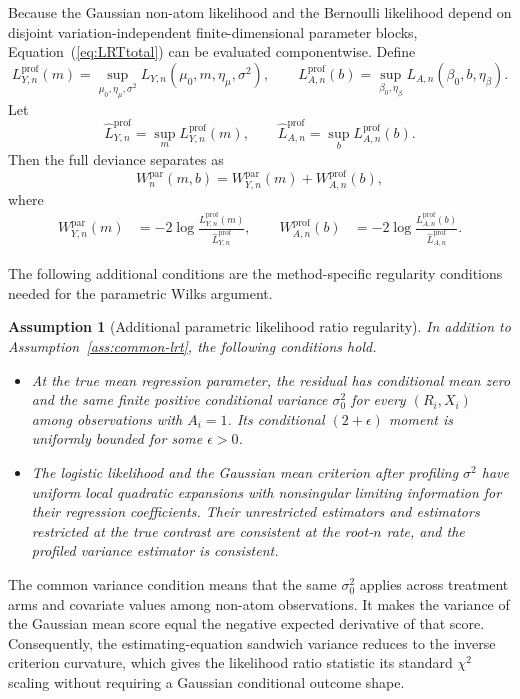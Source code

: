\documentclass[11pt]{article}
\newtheorem{assumption}{Assumption}
\begin{document}
Because the Gaussian non-atom likelihood and the Bernoulli likelihood depend on disjoint variation-independent finite-dimensional parameter blocks, Equation~(\ref{eq:LRTtotal}) can be evaluated componentwise. Define
\[
  L_{Y,n}^{\mathrm{prof}}(m)
  =
  \sup_{\mu_0,\eta_\mu,\sigma^2}
  L_{Y,n}(\mu_0,m,\eta_\mu,\sigma^2),
  \qquad
  L_{A,n}^{\mathrm{prof}}(b)
  =
  \sup_{\beta_0,\eta_\beta}
  L_{A,n}(\beta_0,b,\eta_\beta).
\]
Let
\[
  \widehat{L}_{Y,n}^{\mathrm{prof}}
  =
  \sup_m L_{Y,n}^{\mathrm{prof}}(m),
  \qquad
  \widehat{L}_{A,n}^{\mathrm{prof}}
  =
  \sup_b L_{A,n}^{\mathrm{prof}}(b).
\]
Then the full deviance separates as
\[
  W_n^{\mathrm{par}}(m,b)=W_{Y,n}^{\mathrm{par}}(m)+W_{A,n}^{\mathrm{prof}}(b),
\]
where
\[
\begin{aligned}
  W_{Y,n}^{\mathrm{par}}(m)
  &= -2\log
  \frac{L_{Y,n}^{\mathrm{prof}}(m)}
       {\widehat{L}_{Y,n}^{\mathrm{prof}}},\qquad
  W_{A,n}^{\mathrm{prof}}(b)
  &= -2\log
  \frac{L_{A,n}^{\mathrm{prof}}(b)}
       {\widehat{L}_{A,n}^{\mathrm{prof}}}.
\end{aligned}
\]

The following additional conditions are the method-specific regularity conditions needed for the parametric Wilks argument.

\begin{assumption}[Additional parametric likelihood ratio regularity]\label{ass:parametric-lrt}
In addition to Assumption~\ref{ass:common-lrt}, the following conditions hold.
\begin{itemize}
  \item At the true mean regression parameter, the residual has conditional mean zero and the same finite positive conditional variance $\sigma_0^2$ for every $(R_i,X_i)$ among observations with $A_i=1$. Its conditional $(2+\epsilon)$ moment is uniformly bounded for some $\epsilon>0$.
  \item The logistic likelihood and the Gaussian mean criterion after profiling $\sigma^2$ have uniform local quadratic expansions with nonsingular limiting information for their regression coefficients. Their unrestricted estimators and estimators restricted at the true contrast are consistent at the root-$n$ rate, and the profiled variance estimator is consistent.
\end{itemize}
\end{assumption}

The common variance condition means that the same $\sigma_0^2$ applies across treatment arms and covariate values among non-atom observations. It makes the variance of the Gaussian mean score equal the negative expected derivative of that score. Consequently, the estimating-equation sandwich variance reduces to the inverse criterion curvature, which gives the likelihood ratio statistic its standard $\chi^2$ scaling without requiring a Gaussian conditional outcome shape.
\end{document}
